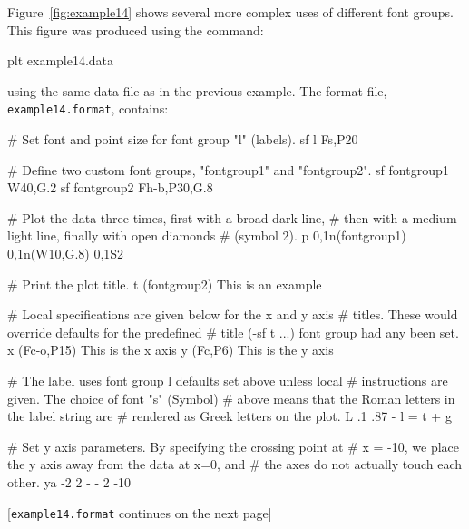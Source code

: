 \documentclass{book}
\begin{document}
\newpage
Figure~\ref{fig:example14} shows several more complex uses of
different font groups.  This figure was produced using the command:
\begin{center}
\begin{boxedverbatim}
plt example14.data %
\end{boxedverbatim}
\end{center}
using the same data file as in the previous example.  The format file,
{\tt example14.\-format}, contains:
\begin{center}
\begin{boxedverbatim}
# Set font and point size for font group "l" (labels).
sf l Fs,P20

# Define two custom font groups, "fontgroup1" and "fontgroup2".
sf fontgroup1 W40,G.2
sf fontgroup2 Fh-b,P30,G.8

# Plot the data three times, first with a broad dark line,
# then with a medium light line, finally with open diamonds
# (symbol 2).
p 0,1n(fontgroup1) 0,1n(W10,G.8) 0,1S2

# Print the plot title.
t (fontgroup2) This is an example

# Local specifications are given below for the x and y axis
# titles.  These would override defaults for the predefined
# title (-sf t ...) font group had any been set.
x (Fc-o,P15) This is the x axis
y (Fc,P6) This is the y axis

# The label uses font group l defaults set above unless local
# instructions are given.  The choice of font "s" (Symbol)
# above means that the Roman letters in the label string are
# rendered as Greek letters on the plot.
L .1 .87 - l = t + g

# Set y axis parameters.  By specifying the crossing point at
# x = -10, we place the y axis away from the data at x=0, and
# the axes do not actually touch each other.
ya -2 2 - - 2 -10
\end{boxedverbatim}

[{\tt example14.format} continues on the next page]
\end{center}
\newpage
\end{document}
